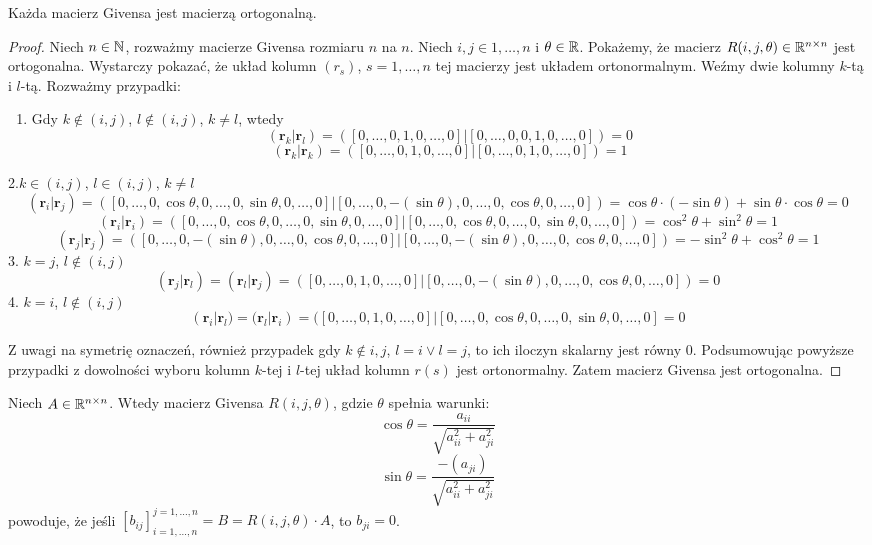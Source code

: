 \documentclass[12pt,a4paper]{report}
\newcommand{\vr}[1]{\mathbf{#1}}
\newcommand{\mx}[1]{{#1}}
\begin{document}
\begin{lemma}
Każda macierz Givensa jest macierzą ortogonalną.
\end{lemma}

\begin{proof}
Niech $n\in \mathbb{N}$, rozważmy macierze Givensa rozmiaru $n$ na $n$. Niech $i,j \in {1,\ldots, n}$ i $\theta \in \mathbb{R}$. Pokażemy, że macierz $\mx{R}(i,j,\theta) \in \setR^{n\times n}$ jest ortogonalna.
Wystarczy pokazać, że układ kolumn $(r_s)$, $s=1,\ldots, n$ tej macierzy jest układem ortonormalnym. Weźmy dwie kolumny $k$-tą i $l$-tą. Rozważmy przypadki:
\begin{enumerate}
\item Gdy $k\notin (i,j)$, $l\notin (i,j)$, $k \neq l$, wtedy
$$
(\vr{r}_{k}|\vr{r}_{l}) = ([0,\ldots, 0,1,0,\ldots,0]|[0,\ldots,0,0,1,0,\ldots,0]) = 0
$$
$$
(\vr{r}_{k}|\vr{r}_{k}) = ([0,\ldots, 0,1,0,\ldots,0]|[0,\ldots,0,1,0,\ldots,0]) = 1
$$
\end{enumerate}

2.$k \in (i,j)$, $l \in (i,j)$, $k \neq l$
{\scriptsize
$$
(\vr{r}_{i}|\vr{r}_{j}) = ([0,\ldots, 0,\cos\theta,0,\ldots,0,\sin\theta,0,\ldots,0]|[0,\ldots, 0,-(\sin\theta),0,\ldots,0,\cos\theta,0,\ldots,0]) = \cos\theta\cdot(-\sin\theta) + \sin\theta\cdot\cos\theta = 0
$$
$$
(\vr{r}_{i}|\vr{r}_{i}) = ([0,\ldots, 0,\cos\theta,0,\ldots,0,\sin\theta,0,\ldots,0]|[0,\ldots, 0,\cos\theta,0,\ldots,0,\sin\theta,0,\ldots,0]) = \cos^{2}\theta + \sin^{2}\theta = 1
$$
$$
(\vr{r}_{j}|\vr{r}_{j}) = ([0,\ldots, 0,-(\sin\theta),0,\ldots,0,\cos\theta,0,\ldots,0]|[0,\ldots, 0,-(\sin\theta),0,\ldots,0,\cos\theta,0,\ldots,0]) = -\sin^{2}\theta + \cos^{2}\theta = 1
$$
}
3. $k=j$, $l\notin (i,j)$
$$
(\vr{r}_{j}|\vr{r}_{l}) = (\vr{r}_{l}|\vr{r}_{j})= ([0,\ldots, 0,1,0,\ldots,0]|[0,\ldots, 0,-(\sin\theta),0,\ldots,0,\cos\theta,0,\ldots,0]) = 0
$$
4. $k=i$, $l\notin(i,j)$
$$
(\vr{r}_{i}|\vr{r}_{l}) = (\vr{r}_{l}|\vr{r}_{i})= ([0,\ldots, 0,1,0,\ldots,0]|[0,\ldots, 0,\cos\theta,0,\ldots,0,\sin\theta,0,\ldots,0] = 0
$$

Z uwagi na symetrię oznaczeń, również przypadek gdy $k\notin{i,j}$, $l=i \lor l=j$, to ich iloczyn skalarny jest równy $0$. Podsumowując powyższe przypadki z dowolności wyboru kolumn $k$-tej i $l$-tej układ kolumn $r(s)$ jest ortonormalny. Zatem macierz Givensa jest ortogonalna.
\end{proof}

\begin{lemma}
Niech $\mx{A} \in \setR^{n \times n}$. Wtedy macierz Givensa $\mx{R}(i,j, \theta)$, gdzie $\theta$ spełnia warunki:
$$
\cos\theta = \frac{a_{ii}}{\sqrt{a_{ii}^{2} + a_{ji}^{2}}}
$$
$$
\sin\theta = \frac{-(a_{ji})}{\sqrt{a_{ii}^{2} + a_{ji}^{2}}}
$$
powoduje, że jeśli $[b_{ij}]_{i=1,\ldots,n}^{j=1,\ldots,n} = \mx{B} = \mx{R}(i,j,\theta)\cdot \mx{A}$, to 
$b_{ji}=0$.
\end{lemma}
\end{document}

